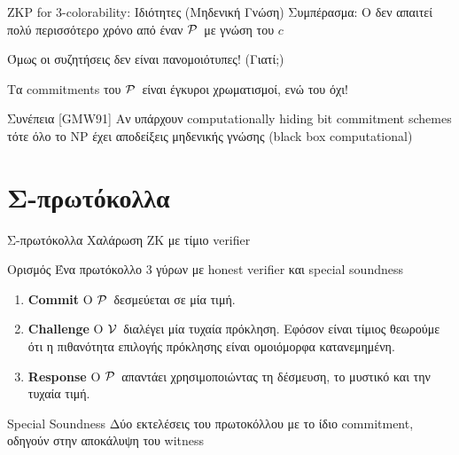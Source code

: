 \documentclass[10pt,handout]{beamer}
\begin{document}
\begin{frame}{ZKP for 3-colorability: Ιδιότητες (Μηδενική Γνώση)} 
Συμπέρασμα: \pause
Ο \siml δεν απαιτεί πολύ περισσότερο χρόνο από έναν $\mathcal{P}\,$ με γνώση του $c$ \pause

\alert{Όμως οι συζητήσεις δεν είναι πανομοιότυπες! (Γιατί;)}

\pause 
Τα commitments του $\mathcal{P}\,$ είναι έγκυροι χρωματισμοί, ενώ του \siml όχι!
\pause
\begin{block}{Συνέπεια [GMW91]}
Αν υπάρχουν computationally hiding bit commitment schemes τότε όλο το NP έχει αποδείξεις μηδενικής γνώσης (black box computational)
\end{block}

\end{frame}

\section{Σ-πρωτόκολλα}

\begin{frame}{Σ-πρωτόκολλα}
Χαλάρωση ZK με τίμιο verifier

\begin{block}{Ορισμός}
Ένα πρωτόκολλο 3 γύρων με honest verifier και special soundness
\begin{enumerate}
	\item \textbf{Commit} O $\mathcal{P}\,$ δεσμεύεται σε μία τιμή. \pause 
	\item \textbf{Challenge} Ο $\mathcal{V}\,$ διαλέγει μία τυχαία πρόκληση. Εφόσον είναι τίμιος θεωρούμε ότι η πιθανότητα επιλογής πρόκλησης είναι ομοιόμορφα κατανεμημένη. \pause
	\item \textbf{Response} O $\mathcal{P}\,$ απαντάει χρησιμοποιώντας τη δέσμευση, το μυστικό και την τυχαία τιμή. \pause
\end{enumerate}
\end{block}

\begin{block}{Special Soundness}
Δύο εκτελέσεις του πρωτοκόλλου με το ίδιο commitment, οδηγούν στην αποκάλυψη του witness
\end{block}

\end{frame}
\end{document}
